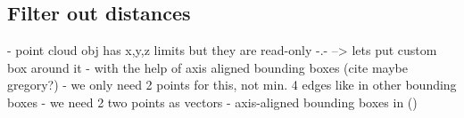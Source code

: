 \subsection{Filter out distances}
- point cloud obj has x,y,z limits but they are read-only -.-
--> lets put custom box around it
- with the help of axis aligned bounding boxes (cite maybe gregory?)
- we only need 2 points for this, not min. 4 edges like in other bounding boxes
- we need 2 two points as vectors
- axis-aligned bounding boxes in (\cite[p.216]{Gregory.2014})
